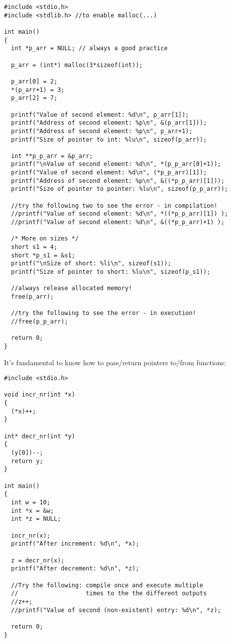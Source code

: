 \documentclass[11pt]{article}
\begin{document}
\begin{lstlisting}
#include <stdio.h>
#include <stdlib.h> //to enable malloc(...)

int main()
{
  int *p_arr = NULL; // always a good practice

  p_arr = (int*) malloc(3*sizeof(int));

  p_arr[0] = 2;
  *(p_arr+1) = 3;
  p_arr[2] = 7;

  printf("Value of second element: %d\n", p_arr[1]);
  printf("Address of second element: %p\n", &(p_arr[1]));
  printf("Address of second element: %p\n", p_arr+1);
  printf("Size of pointer to int: %lu\n", sizeof(p_arr));

  int **p_p_arr = &p_arr;
  printf("\nValue of second element: %d\n", *(p_p_arr[0]+1));
  printf("Value of second element: %d\n", (*p_p_arr)[1]);
  printf("Address of second element: %p\n", &((*p_p_arr)[1]));
  printf("Size of pointer to pointer: %lu\n", sizeof(p_p_arr));

  //try the following two to see the error - in compilation!
  //printf("Value of second element: %d\n", *((*p_p_arr)[1]) );
  //printf("Value of second element: %d\n", &((*p_p_arr)+1) );

  /* More on sizes */
  short s1 = 4;
  short *p_s1 = &s1;
  printf("\nSize of short: %li\n", sizeof(s1));
  printf("Size of pointer to short: %lu\n", sizeof(p_s1));

  //always release allocated memory!
  free(p_arr);

  //try the following to see the error - in execution!
  //free(p_p_arr);

  return 0;
}
\end{lstlisting}

It's fundamental to know how to pass/return pointers to/from functions:

\begin{lstlisting}
#include <stdio.h>

void incr_nr(int *x)
{
  (*x)++;
}

int* decr_nr(int *y)
{
  (y[0])--;
  return y;
}

int main()
{
  int w = 10;
  int *x = &w;
  int *z = NULL;

  incr_nr(x);
  printf("After increment: %d\n", *x);

  z = decr_nr(x);
  printf("After decrement: %d\n", *z);

  //Try the following: compile once and execute multiple
  //                   times to the the different outputs
  //z++;
  //printf("Value of second (non-existent) entry: %d\n", *z);

  return 0;
}
\end{lstlisting}
\end{document}
